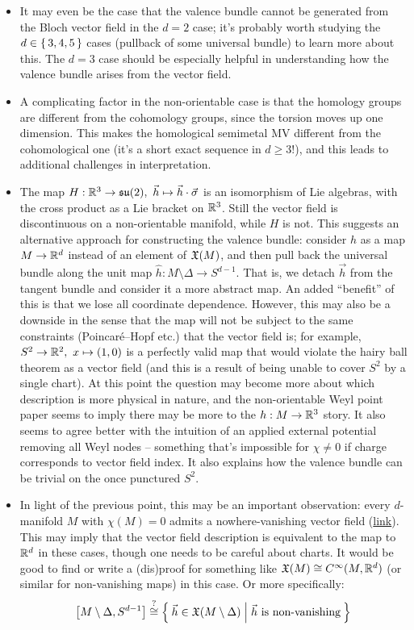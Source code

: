 {\begin{itemize}
	\item It may even be the case that the valence bundle cannot be generated from the Bloch vector field in the $d=2$ case; it's probably worth studying the $d\in\set{3,4,5}$ cases (pullback of some universal bundle) to learn more about this. The $d=3$ case should be especially helpful in understanding how the valence bundle arises from the vector field.
	
	\item A complicating factor in the non-orientable case is that the homology groups are different from the cohomology groups, since the torsion moves up one dimension. This makes the homological semimetal MV different from the cohomological one (it's a short exact sequence in $d\geq3$!), and this leads to additional challenges in interpretation.
	
	\item The map $H: \R^3\to\la[su](2),\ \vec{h}\mapsto \vec{h}\cdot\vec{\sigma}$ is an isomorphism of Lie algebras, with the cross product as a Lie bracket on $\mathbb{R}^3$. Still the vector field is discontinuous on a non-orientable manifold, while $H$ is not. This suggests an alternative approach for constructing the valence bundle: consider $h$ as a map $M\to\mathbb{R}^d$ instead of an element of $\mathfrak{X}(M)$, and then pull back the universal bundle along the unit map $\hat{h}:M\setminus\Delta\to S^{d-1}$. That is, we detach $\vec{h}$ from the tangent bundle and consider it a more abstract map. An added ``benefit'' of this is that we lose all coordinate dependence. However, this may also be a downside in the sense that the map will not be subject to the same constraints (Poincaré--Hopf etc.) that the vector field is; for example, $S^2\to\R^2,\ x\mapsto(1,0)$ is a perfectly valid map that would violate the hairy ball theorem as a vector field (and this is a result of being unable to cover $S^2$ by a single chart). At this point the question may become more about which description is more physical in nature, and the non-orientable Weyl point paper\cite{Foncesca-Vaidya_nonorientable} seems to imply there may be more to the $h:M\to\mathbb{R}^3$ story. It also seems to agree better with the intuition of an applied external potential removing all Weyl nodes -- something that's impossible for $\chi\neq0$ if charge corresponds to vector field index. It also explains how the valence bundle can be trivial on the once punctured $S^2$.
	
	\item In light of the previous point, this may be an important observation: every $d$-manifold $M$ with $\chi(M)=0$ admits a nowhere-vanishing vector field (\href{https://math.stackexchange.com/questions/47370/if-a-manifold-m-has-zero-euler-characteristic-there-is-a-non-vanishing-vector-f}{link}). This may imply that the vector field description is equivalent to the map to $\mathbb{R}^d$ in these cases, though one needs to be careful about charts. It would be good to find or write a (dis)proof for something like $\mathfrak{X}(M)\cong C^\infty(M,\mathbb{R}^d)$ (or similar for non-vanishing maps) in this case. Or more specifically:
	\[
		\big[M\setminus\Delta,S^{d-1}\big] \stackrel{?}{\cong} \Set{\vec{h}\in\mathfrak{X}(M\setminus\Delta) | \text{$\vec{h}$ is non-vanishing}}
	\]
	

\end{itemize}}
